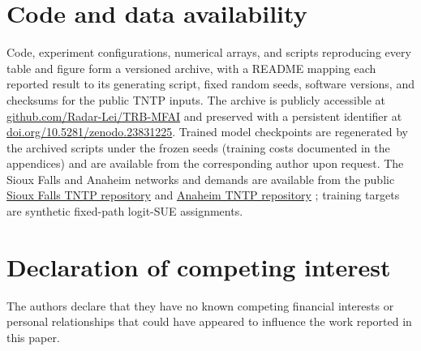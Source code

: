 \documentclass[a4paper,fleqn]{cas-sc}
\begin{document}
\section*{Code and data availability}
Code, experiment configurations, numerical arrays, and scripts
reproducing every table and figure form a versioned archive, with a
README mapping each reported result to its generating script, fixed
random seeds, software versions, and checksums for the public TNTP
inputs. The archive is publicly accessible at
\href{https://github.com/Radar-Lei/TRB-MFAI}{github.com/Radar-Lei/TRB-MFAI}
and preserved with a persistent identifier at
\href{https://doi.org/10.5281/zenodo.23831225}{doi.org/10.5281/zenodo.23831225}.
Trained model checkpoints are regenerated by the archived scripts
under the frozen seeds (training costs documented in the appendices)
and are available from the corresponding author upon request.
The Sioux Falls and Anaheim networks and demands are available from the public
\href{https://github.com/bstabler/TransportationNetworks/tree/master/SiouxFalls}{Sioux Falls TNTP repository}
and \href{https://github.com/bstabler/TransportationNetworks/tree/master/Anaheim}{Anaheim TNTP repository}
\citep{tnfrc2024transportation}; training targets are synthetic fixed-path
logit-SUE assignments.
\section*{Declaration of competing interest}
The authors declare that they have no known competing financial interests
or personal relationships that could have appeared to influence the work
reported in this paper.
\FloatBarrier

\setlength{\bibsep}{0.8pt plus 0.2pt}

\appendix
{}



\end{document}
